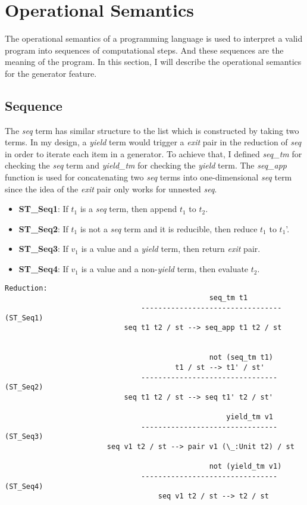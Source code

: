 \section{Operational Semantics}
\label{sec:os}
The operational semantics of a programming language is used to interpret a valid program into sequences of computational steps. And these sequences are the meaning of the program. In this section, I will describe the operational semantics for the generator feature.

\subsection{Sequence}
The \textit{seq} term has similar structure to the list which is constructed by taking two terms.
In my design, a \textit{yield} term would trigger a \textit{exit} pair in the reduction of \textit{seq} in order to iterate each item in a generator.
To achieve that, I defined \textit{seq_tm} for checking the \textit{seq} term and \textit{yield_tm} for checking the \textit{yield} term.
The \textit{seq_app} function is used for concatenating two \textit{seq} terms into one-dimensional \textit{seq} term since the idea of the \textit{exit} pair only works for unnested \textit{seq}.
\begin{itemize}
	\item \textbf{ST_Seq1}: If $t_1$ is a \textit{seq} term, then append $t_1$ to $t_2$. 
	\item \textbf{ST_Seq2}: If $t_1$ is not a \textit{seq} term and it is reducible, then reduce $t_1$ to $t_1$'. 
	\item \textbf{ST_Seq3}: If $v_1$ is a value and a \textit{yield} term, then return \textit{exit} pair.
	\item \textbf{ST_Seq4}: If $v_1$ is a value and a non-\textit{yield} term, then evaluate $t_2$.
\end{itemize}
\begin{lstlisting}
Reduction:
									    		seq_tm t1
								---------------------------------  (ST_Seq1)
							seq t1 t2 / st --> seq_app t1 t2 / st
								

												not (seq_tm t1)
									  	t1 / st --> t1' / st'
								--------------------------------   (ST_Seq2)
							seq t1 t2 / st --> seq t1' t2 / st'
								
													yield_tm v1
								--------------------------------   (ST_Seq3)
						seq v1 t2 / st --> pair v1 (\_:Unit t2) / st
								
												not (yield_tm v1)
								--------------------------------   (ST_Seq4)
									seq v1 t2 / st --> t2 / st
\end{lstlisting}

